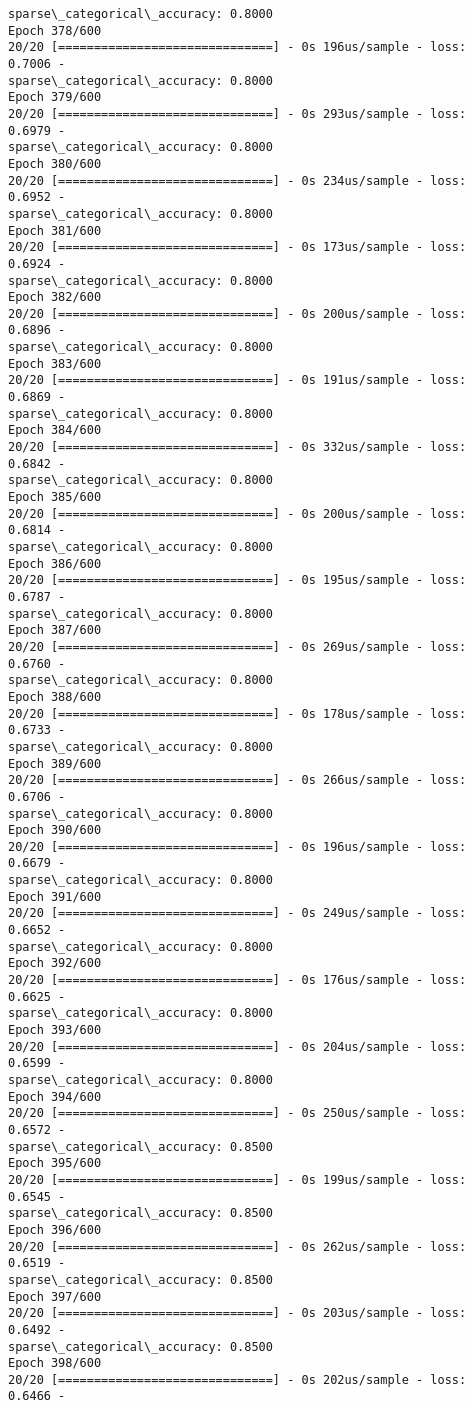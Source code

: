 \documentclass[11pt]{article}
\begin{document}
\begin{Verbatim}[commandchars=\\\{\}]
sparse\_categorical\_accuracy: 0.8000
Epoch 378/600
20/20 [==============================] - 0s 196us/sample - loss: 0.7006 -
sparse\_categorical\_accuracy: 0.8000
Epoch 379/600
20/20 [==============================] - 0s 293us/sample - loss: 0.6979 -
sparse\_categorical\_accuracy: 0.8000
Epoch 380/600
20/20 [==============================] - 0s 234us/sample - loss: 0.6952 -
sparse\_categorical\_accuracy: 0.8000
Epoch 381/600
20/20 [==============================] - 0s 173us/sample - loss: 0.6924 -
sparse\_categorical\_accuracy: 0.8000
Epoch 382/600
20/20 [==============================] - 0s 200us/sample - loss: 0.6896 -
sparse\_categorical\_accuracy: 0.8000
Epoch 383/600
20/20 [==============================] - 0s 191us/sample - loss: 0.6869 -
sparse\_categorical\_accuracy: 0.8000
Epoch 384/600
20/20 [==============================] - 0s 332us/sample - loss: 0.6842 -
sparse\_categorical\_accuracy: 0.8000
Epoch 385/600
20/20 [==============================] - 0s 200us/sample - loss: 0.6814 -
sparse\_categorical\_accuracy: 0.8000
Epoch 386/600
20/20 [==============================] - 0s 195us/sample - loss: 0.6787 -
sparse\_categorical\_accuracy: 0.8000
Epoch 387/600
20/20 [==============================] - 0s 269us/sample - loss: 0.6760 -
sparse\_categorical\_accuracy: 0.8000
Epoch 388/600
20/20 [==============================] - 0s 178us/sample - loss: 0.6733 -
sparse\_categorical\_accuracy: 0.8000
Epoch 389/600
20/20 [==============================] - 0s 266us/sample - loss: 0.6706 -
sparse\_categorical\_accuracy: 0.8000
Epoch 390/600
20/20 [==============================] - 0s 196us/sample - loss: 0.6679 -
sparse\_categorical\_accuracy: 0.8000
Epoch 391/600
20/20 [==============================] - 0s 249us/sample - loss: 0.6652 -
sparse\_categorical\_accuracy: 0.8000
Epoch 392/600
20/20 [==============================] - 0s 176us/sample - loss: 0.6625 -
sparse\_categorical\_accuracy: 0.8000
Epoch 393/600
20/20 [==============================] - 0s 204us/sample - loss: 0.6599 -
sparse\_categorical\_accuracy: 0.8000
Epoch 394/600
20/20 [==============================] - 0s 250us/sample - loss: 0.6572 -
sparse\_categorical\_accuracy: 0.8500
Epoch 395/600
20/20 [==============================] - 0s 199us/sample - loss: 0.6545 -
sparse\_categorical\_accuracy: 0.8500
Epoch 396/600
20/20 [==============================] - 0s 262us/sample - loss: 0.6519 -
sparse\_categorical\_accuracy: 0.8500
Epoch 397/600
20/20 [==============================] - 0s 203us/sample - loss: 0.6492 -
sparse\_categorical\_accuracy: 0.8500
Epoch 398/600
20/20 [==============================] - 0s 202us/sample - loss: 0.6466 -

\end{Verbatim}
\end{document}
